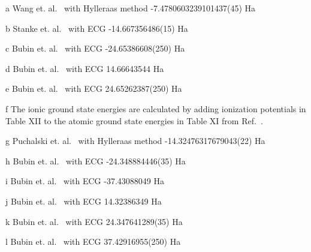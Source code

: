 \begin{table*}[t!]
\begin{threeparttable}
\begin{tablenotes}
\item[a] Wang et. al.~\cite{Wang_Li} with Hylleraas method -7.4780603239101437(45) Ha
\item[b] Stanke et. al.~\cite{Stanke_Be} with ECG -14.667356486(15) Ha
\item[c] Bubin et. al.~\cite{Bubin_B} with ECG -24.65386608(250) Ha
\item[d] Bubin et. al.~\cite{Bubin_BeH_noBO} with ECG \text{-}14.66643544 Ha
\item[e] Bubin et. al.~\cite{Bubin_B} with ECG \text{-}24.65262387(250) Ha
\item[f] The ionic ground state energies are calculated by adding ionization potentials in Table XII to the atomic ground state energies in Table XI from Ref.~\cite{Davidson_Atoms}.
\item[g] Puchalski et. al.~\cite{Puchalski_Be+} with Hylleraas method -14.32476317679043(22) Ha
\item[h] Bubin et. al.~\cite{Bubin_B+} with ECG -24.348884446(35) Ha
\item[i] Bubin et. al.~\cite{Bubin_C+} with ECG -37.43088049 Ha
\item[j] Bubin et. al.~\cite{Bubin_BeH_noBO} with ECG \text{-}14.32386349 Ha
\item[k] Bubin et. al.~\cite{Bubin_B+} with ECG \text{-}24.347641289(35) Ha
\item[l] Bubin et. al.~\cite{Bubin_C+} with ECG \text{-}37.42916955(250) Ha
\end{tablenotes}

\end{threeparttable}
\end{table*}